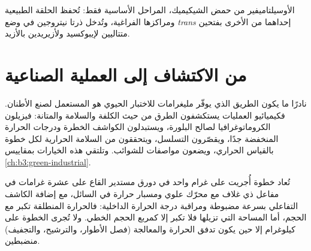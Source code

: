 \begin{omfigure}

{\small الأوسيلتاميفير من حمض الشيكيميك، المراحل الأساسية فقط: تُحفظ الحلقة الطبيعية 
ومراكزها الفراغية، وتُدخل ذرتا نيتروجين في وضع \textit{trans} إحداهما من الأخرى
بفتحين متتاليين لإيبوكسيد ولأزيريدين بالأزيد.}
\end{omfigure}

\section{من الاكتشاف إلى العملية الصناعية}

نادرًا ما يكون الطريق الذي يوفّر مليغرامات للاختبار الحيوي هو المستعمل
لصنع الأطنان. فكيميائيو العمليات يستكشفون الطرق من حيث الكلفة والسلامة والمتانة:
فيزيلون الكروماتوغرافيا لصالح البلورة، ويستبدلون الكواشف
الخطرة ودرجات الحرارة المنخفضة جدًا، ويقصّرون التسلسل، ويتحققون من السلامة
الحرارية لكل خطوة بالقياس الحراري، ويضعون مواصفات للشوائب.
وتلتقي هذه الخيارات بمقاييس \cref{ch:b3:green-industrial}.

\begin{inthelab}
تُعاد خطوة أُجريت على غرام واحد في دورق مستدير القاع على عشرة غرامات في
مفاعل ذي غلاف مع محرّك علوي ومسبار حرارة في
السائل، مع إضافة الكاشف التفاعلي بسرعة مضبوطة ومراقبة
درجة الحرارة الداخلية: فالحرارة المنطلقة تكبر مع الحجم، أما المساحة التي
تزيلها فلا تكبر إلا كمربع الحجم الخطي. ولا تُجرى الخطوة على كيلوغرام إلا حين يكون تدفق الحرارة والمعالجة
(فصل الأطوار، والترشيح، والتجفيف) منضبطين.
\end{inthelab}

